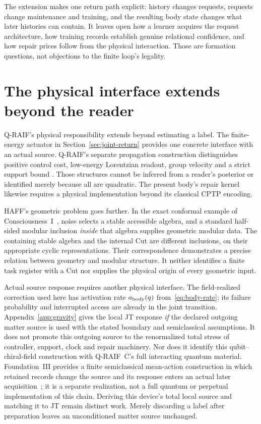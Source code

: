 \documentclass[11pt,a4paper]{article}
\begin{document}
The extension makes one return path explicit:
history changes requests, requests change maintenance and training,
and the resulting body state changes what later histories can contain.
It leaves open how a learner acquires the request architecture, how
training records establish genuine relational confidence, and how
repair prices follow from the physical interaction. Those are
formation questions, not objections to the finite loop's legality.

\section{The physical interface extends beyond the reader}

Q-RAIF's physical responsibility extends beyond estimating a label.
The finite-energy actuator in Section~\ref{sec:joint-return} provides
one concrete interface with an actual source. Q-RAIF's separate propagation
construction distinguishes positive control cost, low-energy
Lorentzian readout, group velocity and a strict support bound
\cite{QRAIFA,QRAIFC,QRAIFME}. Those structures cannot be inferred from
a reader's posterior or identified merely because all are quadratic.
The present body's repair kernel likewise requires a physical
implementation beyond its classical CPTP encoding.

HAFF's geometric problem goes further. In the exact conformal example of Consciousness~I~\cite{PaperI}, noise selects a stable accessible algebra, and a standard half-sided modular inclusion \emph{inside} that algebra supplies geometric modular data. The containing stable algebra and the internal Cut are different inclusions, on their appropriate cyclic representations. Their correspondence demonstrates a precise relation between geometry and modular structure. It neither identifies a finite task register with a Cut nor supplies the physical origin of every geometric input.

Actual source response requires another physical interface.
The field-realized correction used here has activation rate
$a_{\rm body}(q)$ from~\eqref{eq:body-rate}; its failure probability
and interrupted access are already in the joint transition.
Appendix~\ref{app:gravity} gives the local JT response \emph{if} the
declared outgoing matter source is used with the stated boundary and
semiclassical assumptions. It does not promote this outgoing source
to the renormalized total stress of controller, support, clock and
repair machinery. Nor does it identify this qubit--chiral-field
construction with Q-RAIF~C's full interacting quantum material.
Foundation~III provides a finite semiclassical mean-action construction
in which retained records change the source and its response enters
an actual later acquisition~\cite{FoundationIII}; it is a separate
realization, not a full quantum or perpetual implementation of this
chain. Deriving this device's total local source and matching it to JT
remain distinct work. Merely discarding a label after preparation leaves
an unconditioned matter source unchanged.
\end{document}
